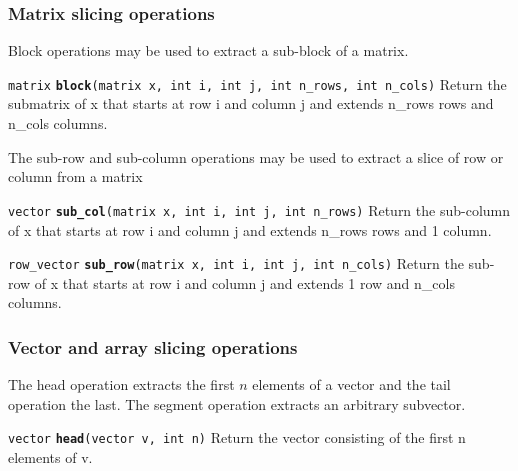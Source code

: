 \documentclass[
  10pt,
]{book}
\begin{document}
\hypertarget{matrix-slicing-operations}{%
\subsubsection{Matrix slicing operations}\label{matrix-slicing-operations}}

Block operations may be used to extract a sub-block of a matrix.


\texttt{matrix} \textbf{\texttt{block}}\texttt{(matrix\ x,\ int\ i,\ int\ j,\ int\ n\_rows,\ int\ n\_cols)}\newline
Return the submatrix of x that starts at row i and column j and
extends n\_rows rows and n\_cols columns.

The sub-row and sub-column operations may be used to extract a slice
of row or column from a matrix


\texttt{vector} \textbf{\texttt{sub\_col}}\texttt{(matrix\ x,\ int\ i,\ int\ j,\ int\ n\_rows)}\newline
Return the sub-column of x that starts at row i and column j and
extends n\_rows rows and 1 column.


\texttt{row\_vector} \textbf{\texttt{sub\_row}}\texttt{(matrix\ x,\ int\ i,\ int\ j,\ int\ n\_cols)}\newline
Return the sub-row of x that starts at row i and column j and extends
1 row and n\_cols columns.

\hypertarget{vector-and-array-slicing-operations}{%
\subsubsection{Vector and array slicing operations}\label{vector-and-array-slicing-operations}}

The head operation extracts the first \(n\) elements of a vector and the
tail operation the last. The segment operation extracts an arbitrary
subvector.


\texttt{vector} \textbf{\texttt{head}}\texttt{(vector\ v,\ int\ n)}\newline
Return the vector consisting of the first n elements of v.
\end{document}
